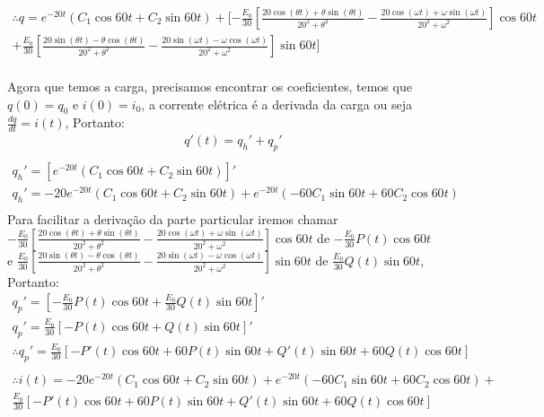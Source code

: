 \documentclass{abntex2}
\begin{document}
\begin{eqnarray*}
    \therefore q = e^{-20t} (C_1 \cos{60t} + C_2 \sin{60t}) + [-\frac{E_0}{30}\left[ \frac{ 20\cos{(\theta t)} +\theta\sin{(\theta t)}}{20^2 +\theta^2} - \frac{20\cos{(\omega t)} +\omega\sin{(\omega t)}}{20^2 +\omega^2} \right]\cos{60t} \\+ \frac{E_0}{30}\left[ \frac{ 20\sin{(\theta t)} -\theta\cos{(\theta t)}}{20^2 +\theta^2} - \frac{20\sin{(\omega t)} -\omega\cos{(\omega t)}}{20^2 +\omega^2} \right]\sin{60t}]\\
\end{eqnarray*}

\newpage
\Large Agora que temos a carga, precisamos encontrar os coeficientes, temos que $q(0) = q_0$ e $i(0) = i_0$, a corrente elétrica é a derivada da carga ou seja $\frac{dq}{dt} = i(t)$, Portanto:\\
\begin{eqnarray*}
    q'(t) = {q_h}' + {q_p}'\\
\end{eqnarray*}
\begin{eqnarray*}
    {q_h}' = [e^{-20t} (C_1 \cos{60t} + C_2 \sin{60t})]'\\
    {q_h}' = -20e^{-20t} (C_1 \cos{60t} + C_2 \sin{60t}) + e^{-20t} (-60C_1 \sin{60t} + 60C_2 \cos{60t})\\
\end{eqnarray*}
\Large Para facilitar a derivação da parte particular iremos chamar\\ $-\frac{E_0}{30}\left[ \frac{ 20\cos{(\theta t)} +\theta\sin{(\theta t)}}{20^2 +\theta^2} - \frac{20\cos{(\omega t)} +\omega\sin{(\omega t)}}{20^2 +\omega^2}\right]\cos{60t}$ de $-\frac{E_0}{30}P(t)\cos{60t}$ \\e $\frac{E_0}{30}\left[ \frac{ 20\sin{(\theta t)} -\theta\cos{(\theta t)}}{20^2 +\theta^2} - \frac{20\sin{(\omega t)} -\omega\cos{(\omega t)}}{20^2 +\omega^2} \right]\sin{60t}$ de $\frac{E_0}{30}Q(t)\sin{60t}$, Portanto:\\
\begin{eqnarray*}
    {q_p}' =  \left[-\frac{E_0}{30}P(t)\cos{60t} + \frac{E_0}{30}Q(t)\sin{60t}\right]'\\
    {q_p}' =  \frac{E_0}{30}[-P(t)\cos{60t} + Q(t)\sin{60t}]'\\
    \therefore {q_p}' =  \frac{E_0}{30}[-P'(t)\cos{60t} + 60P(t)\sin{60t} +Q'(t)\sin{60t} + 60Q(t)\cos{60t}]\\
\end{eqnarray*}
\begin{eqnarray*}
    \therefore i(t) = -20e^{-20t} (C_1 \cos{60t} + C_2 \sin{60t}) + e^{-20t} (-60C_1 \sin{60t} + 60C_2 \cos{60t}) +\\ \frac{E_0}{30}[-P'(t)\cos{60t} + 60P(t)\sin{60t} +Q'(t)\sin{60t} + 60Q(t)\cos{60t}]\\
\end{eqnarray*}
\end{document}
